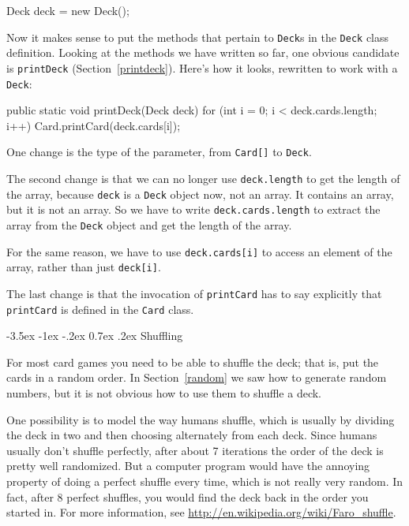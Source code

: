 \documentclass[12pt]{book}
\makeatletter
\renewcommand{\section}{\@startsection {section}{1}{\z@}%
    {-3.5ex \@plus -1ex \@minus -.2ex}%
    {0.7ex \@plus.2ex}%
    {\normalfont\Large\bfseries}}
\theoremstyle{exercise}
\newcommand{\java}[1]{\lstinline{#1}} %
\makeatother
\begin{document}

\begin{code}
    Deck deck = new Deck();
\end{code}

Now it makes sense to put the methods that pertain to \java{Deck}s in the \java{Deck} class definition.
Looking at the methods we have written so far, one obvious candidate is \java{printDeck} (Section~\ref{printdeck}).
Here's how it looks, rewritten to work with a \java{Deck}:

\begin{code}
    public static void printDeck(Deck deck) {
        for (int i = 0; i < deck.cards.length; i++) {
            Card.printCard(deck.cards[i]);
        }
    }
\end{code}

One change is the type of the parameter, from \java{Card[]} to \java{Deck}.

The second change is that we can no longer use \java{deck.length} to get the length of the array, because \java{deck} is a \java{Deck} object now, not an array.
It contains an array, but it is not an array.
So we have to write \java{deck.cards.length} to extract the array from the \java{Deck} object and get the length of the array.

For the same reason, we have to use \java{deck.cards[i]} to access an element of the array, rather than just \java{deck[i]}.

The last change is that the invocation of \java{printCard} has to say explicitly that \java{printCard} is defined in the \java{Card} class.


\section{Shuffling}
\label{shuffle}

For most card games you need to be able to shuffle the deck; that is, put the cards in a random order.
In Section~\ref{random} we saw how to generate random numbers, but it is not obvious how to use them to shuffle a deck.

One possibility is to model the way humans shuffle, which is usually by dividing the deck in two and then choosing alternately from each deck.
Since humans usually don't shuffle perfectly, after about 7 iterations the order of the deck is pretty well randomized.
But a computer program would have the annoying property of doing a perfect shuffle every time, which is not really very random.
In fact, after 8 perfect shuffles, you would find the deck back in the order you started in.
For more information, see \url{http://en.wikipedia.org/wiki/Faro_shuffle}.
\end{document}
